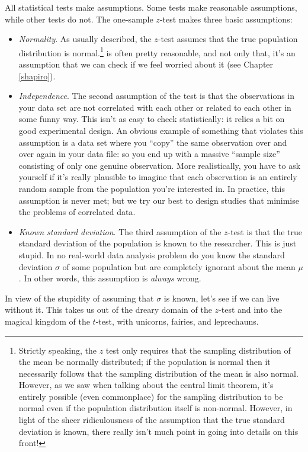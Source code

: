 \documentclass[
]{book}
\providecommand{\tightlist}{%
  \setlength{\itemsep}{0pt}\setlength{\parskip}{0pt}}
\theoremstyle{definition}
\theoremstyle{definition}
\theoremstyle{definition}
\theoremstyle{definition}
\theoremstyle{remark}
\begin{document}
All statistical tests make assumptions. Some tests make reasonable assumptions, while other tests do not. The one-sample \(z\)-test makes three basic assumptions:

\begin{itemize}
\tightlist
\item
  \emph{Normality}. As usually described, the \(z\)-test assumes that the true population distribution is normal.\footnote{Strictly speaking, the \(z\) test only requires that the sampling distribution of the mean be normally distributed; if the population is normal then it necessarily follows that the sampling distribution of the mean is also normal. However, as we saw when talking about the central limit theorem, it's entirely possible (even commonplace) for the sampling distribution to be normal even if the population distribution itself is non-normal. However, in light of the sheer ridiculousness of the assumption that the true standard deviation is known, there really isn't much point in going into details on this front!} is often pretty reasonable, and not only that, it's an assumption that we can check if we feel worried about it (see Chapter \ref{shapiro}).
\item
  \emph{Independence}. The second assumption of the test is that the observations in your data set are not correlated with each other or related to each other in some funny way. This isn't as easy to check statistically: it relies a bit on good experimental design. An obvious example of something that violates this assumption is a data set where you ``copy'' the same observation over and over again in your data file: so you end up with a massive ``sample size'' consisting of only one genuine observation. More realistically, you have to ask yourself if it's really plausible to imagine that each observation is an entirely random sample from the population you're interested in. In practice, this assumption is never met; but we try our best to design studies that minimise the problems of correlated data.
\item
  \emph{Known standard deviation}. The third assumption of the \(z\)-test is that the true standard deviation of the population is known to the researcher. This is just stupid. In no real-world data analysis problem do you know the standard deviation \(\sigma\) of some population but are completely ignorant about the mean \(\mu\). In other words, this assumption is \emph{always} wrong.
\end{itemize}

In view of the stupidity of assuming that \(\sigma\) is known, let's see if we can live without it. This takes us out of the dreary domain of the \(z\)-test and into the magical kingdom of the \(t\)-test, with unicorns, fairies, and leprechauns.
\end{document}
